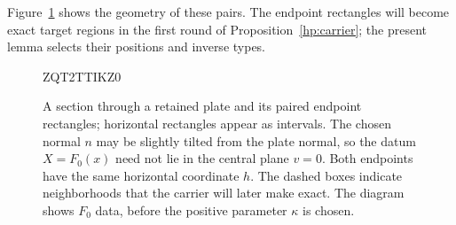 \documentclass[11pt]{article}
\numberwithin{equation}{section}
\theoremstyle{definition}
\theoremstyle{remark}
\begin{document}
Figure~\ref{hp:fig-paired-endpoints} shows the geometry of these pairs.
The endpoint rectangles will become exact target regions in the first
round of Proposition~\ref{hp:carrier}; the present lemma selects their
positions and inverse types.

\begin{figure}[htbp]

ZQT2TTIKZ0
\caption{A section through a retained plate and its paired endpoint
rectangles; horizontal rectangles appear as intervals.  The chosen
normal $n$ may be slightly tilted from the plate normal, so the datum
$X=F_0(x)$ need not lie in the central plane $v=0$.  Both endpoints have
the same horizontal coordinate $h$.  The dashed boxes indicate
neighborhoods that the carrier will later make exact.  The diagram
shows $F_0$ data, before the positive parameter $\kappa$ is chosen.}
\label{hp:fig-paired-endpoints}
\end{figure}
\end{document}
